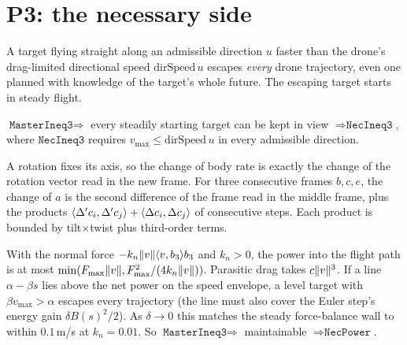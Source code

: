 \chapter{P3: the necessary side}
\label{chap:p3}

\begin{theorem}
\label{thm:dirspeed-wall}
\leanok
A target flying straight along an admissible direction $u$ faster than the drone's
drag-limited directional speed $\mathrm{dirSpeed}\,u$ escapes \emph{every} drone trajectory,
even one planned with knowledge of the target's whole future. The escaping target starts in
steady flight.
\end{theorem}

\begin{theorem}[P3 bracket]
\label{thm:p3-bracket}
\leanok
{}
$\texttt{MasterIneq3}\Rightarrow$ every steadily starting target can be kept in view
$\Rightarrow\texttt{NecIneq3}$, where $\texttt{NecIneq3}$ requires
$v_{\max}\le\mathrm{dirSpeed}\,u$ in every admissible direction.
\end{theorem}

\begin{theorem}
\label{thm:rate-sharp}
\leanok
{}
A rotation fixes its axis, so the change of body rate is exactly the change of the rotation
vector read in the new frame. For three consecutive frames $b,c,e$, the change of $a$ is the
second difference of the frame read in the middle frame, plus the products
$\langle \Delta' c_i, \Delta' c_j \rangle+\langle \Delta c_i, \Delta c_j \rangle$ of consecutive steps.
Each product is bounded by tilt$\times$twist plus third-order terms.
\end{theorem}

\begin{theorem}
\label{thm:power-wall}
\leanok
{}
With the normal force $-k_n\lVert v \rVert\langle v, b_3 \rangle b_3$ and $k_n>0$, the power into the flight
path is at most $\min(F_{\max}\lVert v \rVert, F_{\max}^2/(4k_n\lVert v \rVert))$. Parasitic drag takes
$c\lVert v \rVert^3$. If a line $\alpha-\beta s$ lies above the net power on the speed envelope,
a level target with $\beta v_{\max}>\alpha$ escapes every trajectory (the line must also cover the Euler step's
energy gain $\delta B(s)^2/2$). As $\delta\to0$ this matches the steady force-balance wall to within $0.1$\,m/s at
$k_n=0.01$. So
$\texttt{MasterIneq3}\Rightarrow$ maintainable $\Rightarrow\texttt{NecPower}$.
\end{theorem}

